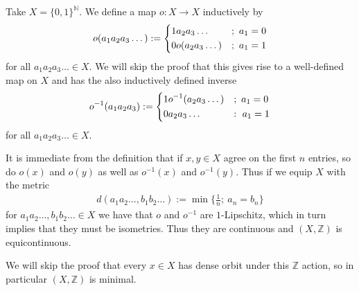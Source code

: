 \begin{example}
	Take $X = \{0, 1\}^\mathbb{N}$. We define a map $o: X \to X$ inductively by
	\begin{align*}
		o(a_1a_2a_3\dots) :=
		\begin{dcases}
			1a_2a_3\dots &;\ a_1 = 0\\
			0o(a_2a_3\dots) &;\ a_1 = 1
		\end{dcases}
	\end{align*}
	for all $a_1a_2a_3\dots \in X$. We will skip the proof that this gives rise to a well-defined map on $X$ and has the also inductively defined inverse
	\begin{align*}
		o^{-1}(a_1a_2a_3) :=
		\begin{dcases}
			1o^{-1}(a_2a_3\dots) &;\ a_1=0\\
			0a_2a_3\dots &:\ a_1=1
		\end{dcases}
	\end{align*}
	for all $a_1a_2a_3\dots \in X$.
	
	It is immediate from the definition that if $x, y \in X$ agree on the first $n$ entries, so do $o(x)$ and $o(y)$ as well as $o^{-1}(x)$ and $o^{-1}(y)$. Thus if we equip $X$ with the metric
	\begin{align*}
		d(a_1a_2\dots, b_1b_2\dots) := \min\{\frac{1}{n};\ a_n=b_n\}
	\end{align*}
	for $a_1a_2\dots, b_1b_2\dots \in X$ we have that $o$ and $o^{-1}$ are $1$-Lipschitz, which in turn implies that they must be isometries. Thus they are continuous and $(X, \mathbb{Z})$ is equicontinuous.
	
	We will skip the proof that every $x \in X$ has dense orbit under this $\mathbb{Z}$ action, so in particular $(X, \mathbb{Z})$ is minimal.
\end{example}

